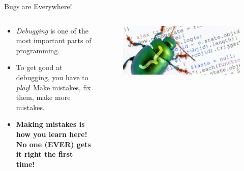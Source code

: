 \documentclass[10pt]{beamer}
\begin{document}
\begin{frame}{Bugs are Everywhere!}
	
	\begin{columns}	
		\begin{column}{0.5\textwidth}
			\begin{itemize}[<+->]
				\item \textit{Debugging} is one of the most important parts of programming.
				\item To get good at debugging, you have to \textit{play}! Make mistakes, fix them, make more mistakes.
				\item \textbf{Making mistakes is how you learn here! No one (EVER) gets it right the first time!}				
			\end{itemize}
		\end{column}
		\begin{column}{0.5\textwidth}
			\begin{figure}[h]		
				\centering
				\includegraphics[scale=0.1]{debug.jpg}
				\caption*{}
			\end{figure}
		\end{column}
	\end{columns}
	
\end{frame}
\end{document}
